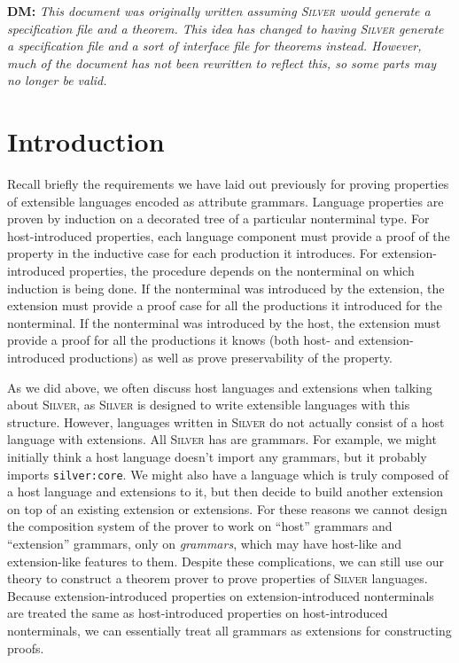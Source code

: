 \documentclass[11pt]{article}
\newcommand{\grammar}[1]{\texttt{#1}}
\newcommand{\silver}{\textsc{Silver}}
\newcommand{\dnote}[1]{{\color{orange} \textbf{DM:} \emph{#1}}}
\begin{document}
\dnote{This document was originally written assuming \silver{} would
  generate a specification file and a theorem.  This idea has changed
  to having \silver{} generate a specification file and a sort of
  interface file for theorems instead.  However, much of the document
  has not been rewritten to reflect this, so some parts may no longer
  be valid.}


\section{Introduction}

Recall briefly the requirements we have laid out previously for
proving properties of extensible languages encoded as attribute
grammars.  Language properties are proven by induction on a decorated
tree of a particular nonterminal type.  For host-introduced
properties, each language component must provide a proof of the
property in the inductive case for each production it introduces.  For
extension-introduced properties, the procedure depends on the
nonterminal on which induction is being done.  If the nonterminal was
introduced by the extension, the extension must provide a proof case
for all the productions it introduced for the nonterminal.  If the
nonterminal was introduced by the host, the extension must provide a
proof for all the productions it knows (both host- and
extension-introduced productions) as well as prove preservability of
the property.


As we did above, we often discuss host languages and extensions when
talking about \silver{}, as \silver{} is designed to write extensible
languages with this structure.  However, languages written in
\silver{} do not actually consist of a host language with extensions.
All \silver{} has are grammars.
%
For example, we might initially think a host language doesn't import
any grammars, but it probably imports \grammar{silver:core}.
%
We might also have a language which is truly composed of a host
language and extensions to it, but then decide to build another
extension on top of an existing extension or extensions.
%
For these reasons we cannot design the composition system of the
prover to work on ``host'' grammars and ``extension'' grammars, only
on \emph{grammars}, which may have host-like and extension-like
features to them.
%
Despite these complications, we can still use our theory to construct
a theorem prover to prove properties of \silver{} languages.  Because
extension-introduced properties on extension-introduced nonterminals
are treated the same as host-introduced properties on host-introduced
nonterminals, we can essentially treat all grammars as extensions for
constructing proofs.
\end{document}
